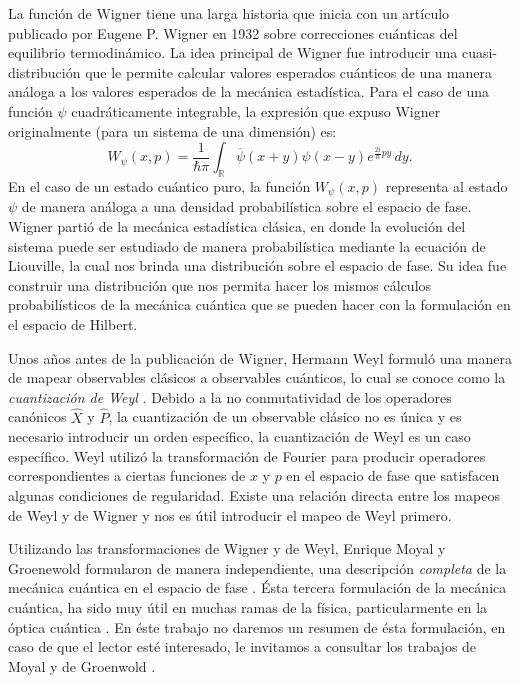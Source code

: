 \documentclass[a4paper]{report}
\DeclareMathOperator{\R}{\mathbb{R}}
\begin{document}
  La función de Wigner tiene una larga historia que inicia
  con un artículo publicado por Eugene P. Wigner en 1932
  \cite{wigner1932} sobre correcciones cuánticas del
  equilibrio termodinámico. La idea principal de Wigner fue
  introducir una cuasi-distribución que le permite calcular
  valores esperados cuánticos de una manera análoga a los
  valores esperados de la mecánica estadística. Para el caso
  de una función $\psi$ cuadráticamente integrable, la
  expresión que expuso Wigner originalmente (para un sistema
  de una dimensión) es:
  \begin{equation}
    \label{eqn:wigners_original}
    W_\psi(x,p)
    = \frac{1}{\hbar \pi} \int_{\R}
    \overline{\psi}(x+y)\psi(x-y) e^{\frac{2i}{\hbar}py} \,
    dy.
  \end{equation}
  En el caso de un estado cuántico puro, la función
  $W_\psi(x,p)$ representa al estado $\psi$ de manera
  análoga a una densidad probabilística sobre el espacio de
  fase. Wigner partió de la mecánica estadística clásica, en
  donde la evolución del sistema puede ser estudiado de
  manera probabilística mediante la ecuación de Liouville,
  la cual nos brinda una distribución sobre el espacio de
  fase.  Su idea fue construir una distribución que nos
  permita hacer los mismos cálculos probabilísticos de la
  mecánica cuántica que se pueden hacer con la formulación
  en el espacio de Hilbert.

  Unos años antes de la publicación de Wigner, Hermann Weyl
  formuló una manera de mapear observables clásicos a
  observables cuánticos, lo cual se conoce como la
  \textit{cuantización de Weyl} \cite{degosson2021}. Debido
  a la no conmutatividad de los operadores canónicos $\hat
  X$ y $\hat P$, la cuantización de un observable clásico no
  es única y es necesario introducir un orden específico, la
  cuantización de Weyl es un caso específico.  Weyl utilizó
  la transformación de Fourier para producir operadores
  correspondientes a ciertas funciones de $x$ y $p$ en el
  espacio de fase que satisfacen algunas condiciones de
  regularidad. Existe una relación directa entre los mapeos
  de Weyl y de Wigner y nos es útil introducir el mapeo de
  Weyl primero.

  Utilizando las transformaciones de Wigner y de Weyl,
  Enrique Moyal y Groenewold formularon de manera
  independiente, una descripción \textit{completa} de la
  mecánica cuántica en el espacio de fase
  \cite{curtright2012}. Ésta tercera formulación de la
  mecánica cuántica, ha sido muy útil en muchas ramas de la
  física, particularmente en la óptica cuántica
  \cite{zachos2005}. En éste trabajo no daremos un resumen
  de ésta formulación, en caso de que el lector esté
  interesado, le invitamos a consultar los trabajos de Moyal
  \cite{moyal1949} y de Groenwold \cite{groenewold}.
\end{document}
